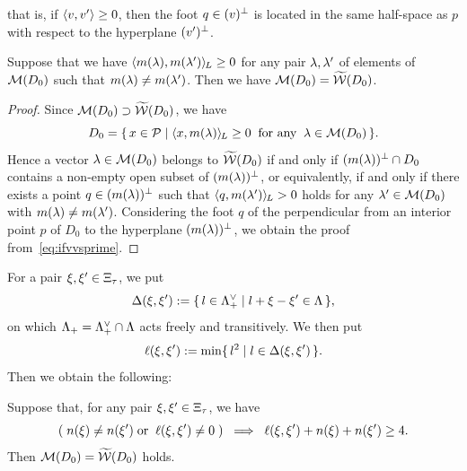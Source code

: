 \documentclass{amsart} %
\begin{document}
%
that is, if $\langle v, v^{\prime} \rangle\ge 0$, 
then the foot $q\in (v)^{\perp}$ is located in the same half-space as $p$ with respect to the hyperplane 
$(v^{\prime})^{\perp}$.
%
%
\begin{lemma}\label{lem:pairsofMMM}
Suppose that we have
$\langle m(\lambda), m(\lambda^{\prime}) \rangle_{\hskip -1pt L}\ge 0$
for any pair $\lambda, \lambda^{\prime}$ of elements of $ \mathord{\mathcal{M}}(D_0)$
such that $m(\lambda)\ne m(\lambda^{\prime})$.
Then we have 
$\mathord{\mathcal{M}}(D_0)=\widetilde{\mathord{\mathcal{W}}} (D_0)$.
\end{lemma}
%
\begin{proof}
Since $\mathord{\mathcal{M}}(D_0)\supset \widetilde{\mathord{\mathcal{W}}} (D_0)$,
 we have 
 \[
 D_0=\{\,{x\in \mathord{\mathcal{P}}}\mid {\langle x, m(\lambda) \rangle_{\hskip -1pt L}\ge 0\;\; \textrm{for any} \;\; \lambda\in \mathord{\mathcal{M}}(D_0)} \,\}.
\]
Hence a vector $\lambda\in \mathord{\mathcal{M}}(D_0)$ belongs to $\widetilde{\mathord{\mathcal{W}}} (D_0)$
if and only if 
$(m(\lambda))^{\perp} \cap D_0$ contains a non-empty open subset of $(m(\lambda))^{\perp} $,
or equivalently,
if and only if 
there exists a point $q\in (m(\lambda))^{\perp}$
such that $\langle q, m(\lambda^{\prime}) \rangle_{\hskip -1pt L}> 0$ holds for any $\lambda^{\prime}\in \mathord{\mathcal{M}}(D_0)$
with $m(\lambda)\ne m(\lambda^{\prime})$.
Considering the foot $q$ of 
the perpendicular from an interior point $p$ of $D_0$
to the hyperplane $(m(\lambda))^{\perp}$,
we obtain the proof from~\eqref{eq:ifvvsprime}.
\end{proof}
%
%
For a pair $\xi, \xi^{\prime}\in \Xi_{\tau}$,
we put
%
\begin{equation}\label{eq:diffellset}
\Delta(\xi, \xi^{\prime}):=
\{\,{l\in \Lambda_{+}^{\vee}}\mid {l+\xi-\xi^{\prime}\in \Lambda} \,\},
\end{equation}
%
on which $\Lambda_{+}= \Lambda_{+}^{\vee}\cap\Lambda$ acts freely and transitively.
We then put 
%
\begin{equation}\label{eq:diffell}
\ell(\xi, \xi^{\prime}):=\min\{\,{l^2}\mid {l\in \Delta(\xi, \xi^{\prime})} \,\}.
\end{equation}
%
Then we obtain the following:
%
\begin{lemma}\label{lem:MMMtilwalls}
Suppose that, for any pair $\xi, \xi^{\prime}\in \Xi_{\tau}$,
we have
%
\begin{equation}\label{eq:nnell}
(\;n(\xi)\ne n(\xi^{\prime}) \; \textrm{\rm or}\; \;\ell(\xi, \xi^{\prime})\ne 0 \;)\;\;\Longrightarrow\;\; \ell(\xi, \xi^{\prime})+n(\xi)+n(\xi^{\prime})\ge 4.
\end{equation}
%
Then $\mathord{\mathcal{M}}(D_0)=\widetilde{\mathord{\mathcal{W}}} (D_0)$ holds.
\end{lemma}
\end{document}
